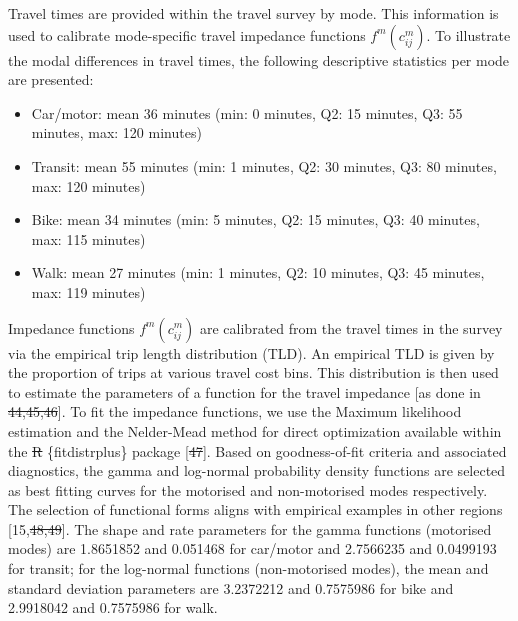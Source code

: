 \documentclass[10pt,letterpaper]{article}
\providecommand{\tightlist}{%
  \setlength{\itemsep}{0pt}\setlength{\parskip}{0pt}}
\providecommand{\DIFaddtex}[1]{{\protect\color{blue}\uwave{#1}}} %
\providecommand{\DIFdeltex}[1]{{\protect\color{red}\sout{#1}}}                      %
\providecommand{\DIFaddbegin}{} %
\providecommand{\DIFaddend}{} %
\providecommand{\DIFdelbegin}{} %
\providecommand{\DIFdelend}{} %
\providecommand{\DIFadd}[1]{\texorpdfstring{\DIFaddtex{#1}}{#1}} %
\providecommand{\DIFdel}[1]{\texorpdfstring{\DIFdeltex{#1}}{}} %
\newcommand{\DIFscaledelfig}{0.5}
\newlength{\DIFdelgraphicswidth} %
\newlength{\DIFdelgraphicsheight} %
\newcommand{\DIFaddincludegraphics}[2][]{{\color{blue}\fbox{\DIFOincludegraphics[#1]{#2}}}} %
\newcommand{\DIFdelincludegraphics}[2][]{%
\sbox{\DIFdelgraphicsbox}{\DIFOincludegraphics[#1]{#2}}%
\settoboxwidth{\DIFdelgraphicswidth}{\DIFdelgraphicsbox} %
\settoboxtotalheight{\DIFdelgraphicsheight}{\DIFdelgraphicsbox} %
\scalebox{\DIFscaledelfig}{%
\parbox[b]{\DIFdelgraphicswidth}{\usebox{\DIFdelgraphicsbox}\\[-\baselineskip] \rule{\DIFdelgraphicswidth}{0em}}\llap{\resizebox{\DIFdelgraphicswidth}{\DIFdelgraphicsheight}{%
\setlength{\unitlength}{\DIFdelgraphicswidth}%
\begin{picture}(1,1)%
\thicklines\linethickness{2pt} %
{\color[rgb]{1,0,0}\put(0,0){\framebox(1,1){}}}%
{\color[rgb]{1,0,0}\put(0,0){\line( 1,1){1}}}%
{\color[rgb]{1,0,0}\put(0,1){\line(1,-1){1}}}%
\end{picture}%
}\hspace*{3pt}}} %
} %
\DeclareRobustCommand{\DIFaddbegin}{\DIFOaddbegin \let\includegraphics\DIFaddincludegraphics} %
\DeclareRobustCommand{\DIFaddend}{\DIFOaddend \let\includegraphics\DIFOincludegraphics} %
\DeclareRobustCommand{\DIFdelbegin}{\DIFOdelbegin \let\includegraphics\DIFdelincludegraphics} %
\DeclareRobustCommand{\DIFdelend}{\DIFOaddend \let\includegraphics\DIFOincludegraphics} %
\begin{document}
Travel times are provided within the travel survey by mode. This
information is used to calibrate mode-specific travel impedance
functions \(f^m(c_{ij}^m)\). To illustrate the modal differences in
travel times, the following descriptive statistics per mode are
presented:

\begin{itemize}
\tightlist
\item
  Car/motor: mean 36 minutes (min: 0 minutes, Q2: 15 minutes, Q3: 55
  minutes, max: 120 minutes)
\item
  Transit: mean 55 minutes (min: 1 minutes, Q2: 30 minutes, Q3: 80
  minutes, max: 120 minutes)
\item
  Bike: mean 34 minutes (min: 5 minutes, Q2: 15 minutes, Q3: 40 minutes,
  max: 115 minutes)
\item
  Walk: mean 27 minutes (min: 1 minutes, Q2: 10 minutes, Q3: 45 minutes,
  max: 119 minutes)
\end{itemize}

Impedance functions \(f^m(c_{ij}^m)\) are calibrated from the travel
times in the survey via the empirical trip length distribution (TLD). An
empirical TLD is given by the proportion of trips at various travel cost
bins. This distribution is then used to estimate the parameters of a
function for the travel impedance {[}as done in \DIFdelbegin \DIFdel{44,45,46}\DIFdelend \DIFaddbegin \DIFadd{56,57,58}\DIFaddend {]}. To fit the
impedance functions, we use the Maximum likelihood estimation and the
Nelder-Mead method for direct optimization available within the
\DIFdelbegin \DIFdel{R
}\DIFdelend \{fitdistrplus\} \DIFaddbegin \DIFadd{R }\DIFaddend package {[}\DIFdelbegin \DIFdel{47}\DIFdelend \DIFaddbegin \DIFadd{59}\DIFaddend {]}. Based on goodness-of-fit criteria
and associated diagnostics, the gamma and log-normal probability density
functions are selected as best fitting curves for the motorised and
non-motorised modes respectively. The selection of functional forms
aligns with empirical examples in other regions {[}15,\DIFdelbegin \DIFdel{48,49}\DIFdelend \DIFaddbegin \DIFadd{60,61}\DIFaddend {]}. The
shape and rate parameters for the gamma functions (motorised modes) are
1.8651852 and 0.051468 for car/motor and 2.7566235 and 0.0499193 for
transit; for the log-normal functions (non-motorised modes), the mean
and standard deviation parameters are 3.2372212 and 0.7575986 for bike
and 2.9918042 and 0.7575986 for walk.
\end{document}
